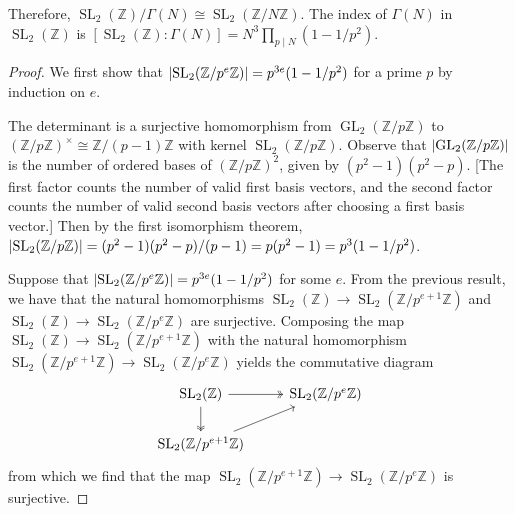 \documentclass[10pt,leqno]{article}
\DeclareMathOperator{\GL}{GL}
\DeclareMathOperator{\SL}{SL}
\begin{document}
Therefore, $\SL_2(\mathbb{Z})/\varGamma(N)\cong \SL_2(\mathbb{Z}/N\mathbb{Z})$. The index of $\varGamma(N)$ in $\SL_2(\mathbb{Z})$ is $[\SL_2(\mathbb{Z}): \varGamma(N)] = N^3\prod_{p\mid N}(1-1/p^2)$.
\begin{proof}
    We first show that $\abs{\SL_2(\mathbb{Z}/p^e\mathbb{Z})} = p^{3e}(1-1/p^2)$ for a prime $p$ by induction on $e$.

    The determinant is a surjective homomorphism from $\GL_2(\mathbb{Z}/p\mathbb{Z})$ to $(\mathbb{Z}/p\mathbb{Z})^\times\cong \mathbb{Z}/(p-1)\mathbb{Z}$ with kernel $\SL_2(\mathbb{Z}/p\mathbb{Z})$. Observe that $\abs{\GL_2(\mathbb{Z}/p\mathbb{Z})}$ is the number of ordered bases of $(\mathbb{Z}/p\mathbb{Z})^2$, given by $(p^2-1)(p^2-p)$. [The first factor counts the number of valid first basis vectors, and the second factor counts the number of valid second basis vectors after choosing a first basis vector.] Then by the first isomorphism theorem, $\abs{\SL_2(\mathbb{Z}/p\mathbb{Z})} = (p^2-1)(p^2-p)/(p-1) = p(p^2-1) = p^3(1-1/p^2)$.
    
    Suppose that $\abs{\SL_2(\mathbb{Z}/p^e\mathbb{Z})} = p^{3e}(1-1/p^2)$ for some $e$. From the previous result, we have that the natural homomorphisms $\SL_2(\mathbb{Z})\to \SL_2(\mathbb{Z}/p^{e+1}\mathbb{Z})$ and $\SL_2(\mathbb{Z})\to \SL_2(\mathbb{Z}/p^e\mathbb{Z})$ are surjective. Composing the map $\SL_2(\mathbb{Z})\to \SL_2(\mathbb{Z}/p^{e+1}\mathbb{Z})$ with the natural homomorphism $\SL_2(\mathbb{Z}/p^{e+1}\mathbb{Z})\to \SL_2(\mathbb{Z}/p^e\mathbb{Z})$ yields the commutative diagram \[\begin{tikzcd}
        {\SL_2(\mathbb{Z})} & {\SL_2(\mathbb{Z}/p^e\mathbb{Z})} \\
        {\SL_2(\mathbb{Z}/p^{e+1}\mathbb{Z})}
        \arrow[from=2-1, to=1-2]
        \arrow[two heads, from=1-1, to=2-1]
        \arrow[two heads, from=1-1, to=1-2]
    \end{tikzcd}\] from which we find that the map $\SL_2(\mathbb{Z}/p^{e+1}\mathbb{Z})\to \SL_2(\mathbb{Z}/p^e\mathbb{Z})$ is surjective.


\end{proof}
\end{document}
